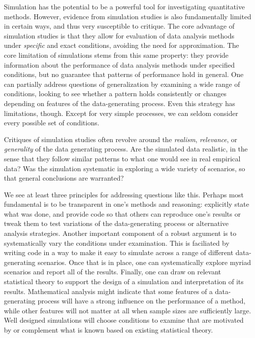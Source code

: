 \documentclass[
]{book}
\begin{document}
Simulation has the potential to be a powerful tool for investigating quantitative methods.
However, evidence from simulation studies is also fundamentally limited in certain ways, and thus very susceptible to critique.
The core advantage of simulation studies is that they allow for evaluation of data analysis methods under \emph{specific} and exact conditions, avoiding the need for approximation.
The core limitation of simulations stems from this same property: they provide information about the performance of data analysis methods under specified conditions, but no guarantee that patterns of performance hold in general.
One can partially address questions of generalization by examining a wide range of conditions, looking to see whether a pattern holds consistently or changes depending on features of the data-generating process.
Even this strategy has limitations, though.
Except for very simple processes, we can seldom consider every possible set of conditions.

Critiques of simulation studies often revolve around the \emph{realism}, \emph{relevance}, or \emph{generality} of the data generating process.
Are the simulated data realistic, in the sense that they follow similar patterns to what one would see in real empirical data?
Was the simulation systematic in exploring a wide variety of scenarios, so that general conclusions are warranted?

We see at least three principles for addressing questions like this.
Perhaps most fundamental is to be transparent in one's methods and reasoning:
explicitly state what was done, and provide code so that others can reproduce one's results or tweak them to test variations of the data-generating process or alternative analysis strategies.
Another important component of a robust argument is to systematically vary the conditions under examination. This is faciliated by writing code in a way to make it easy to simulate across a range of different data-generating scenarios.
Once that is in place, one can systematically explore myriad scenarios and report all of the results.
Finally, one can draw on relevant statistical theory to support the design of a simulation and interpretation of its results.
Mathematical analysis might indicate that some features of a data-generating process will have a strong influence on the performance of a method, while other features will not matter at all when sample sizes are sufficiently large.
Well designed simulations will choose conditions to examine that are motivated by or complement what is known based on existing statistical theory.
\end{document}
